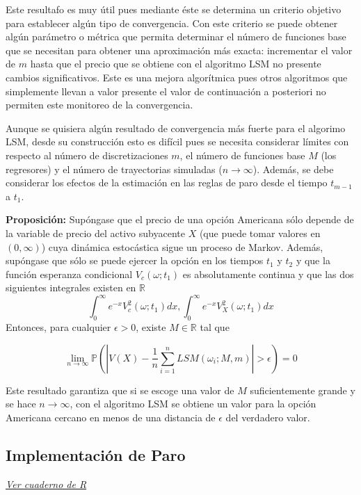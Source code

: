 \documentclass[12pt,reqno,letter]{article}
\begin{document}
	Este resultafo es muy útil pues mediante éste se determina un criterio
	objetivo para establecer algún tipo de convergencia. Con este criterio
	se puede obtener algún parámetro o métrica que permita determinar el
	número de funciones base que se necesitan para obtener una aproximación
	más exacta: incrementar el valor de \(m\) hasta que el precio que se
	obtiene con el algoritmo LSM no presente cambios significativos. Este es
	una mejora algorítmica pues otros algoritmos que simplemente llevan a
	valor presente el valor de continuación a posteriori no permiten este
	monitoreo de la convergencia.
	
	Aunque se quisiera algún resultado de convergencia más fuerte para el
	algorimo LSM, desde su construcción esto es difícil pues se necesita
	considerar límites con respecto al número de discretizaciones \(m\), el
	número de funciones base \(M\) (los regresores) y el número de
	trayectorias simuladas (\(n\rightarrow \infty\)). Además, se debe
	considerar los efectos de la estimación en las reglas de paro desde el
	tiempo \(t_{m-1}\) a \(t_1\).
	
	\textbf{Proposición:} Supóngase que el precio de una opción Americana
	sólo depende de la variable de precio del activo subyacente \(X\) (que
	puede tomar valores en \((0,\infty)\)) cuya dinámica estocástica sigue
	un proceso de Markov. Además, supóngase que sólo se puede ejercer la
	opción en los tiempos \(t_1\) y \(t_2\) y que la función esperanza
	condicional \(V_c(\omega;t_1)\) es absolutamente continua y que las dos
	siguientes integrales existen en \(\mathbb{R}\)
	\[\int_0^{\infty}e^{-x}V^2_c(\omega;t_1)dx, \int_0^{\infty}e^{-x}V^2_X(\omega;t_1)dx\]
	Entonces, para cualquier \(\epsilon>0\), existe \(M\in\mathbb{R}\) tal
	que
	
	\[\lim_{n\rightarrow \infty} \mathbb{P}\left(\left|V(X)-\frac{1}{n}\sum_{i=1}^n LSM(\omega_i;M,m)\right|>\epsilon\right)=0\]
	
	Este resultado garantiza que si se escoge una valor de \(M\)
	suficientemente grande y se hace \(n\rightarrow \infty\), con el
	algoritmo LSM se obtiene un valor para la opción Americana cercano en
	menos de una distancia de \(\epsilon\) del verdadero valor.
	
	\subsection{Implementación de Paro}
	
	\textit{\href{https://www.dropbox.com/s/pfarddbjlv2tc5z/implementacion_paro.pdf?dl=0}{Ver cuaderno de R}}
	
\end{document}
